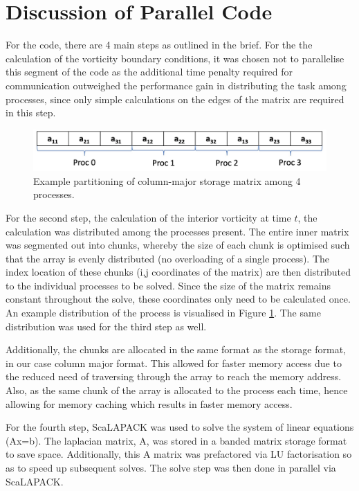 \documentclass[11pt]{article}
\begin{document}
	\section{Discussion of Parallel Code}
	For the code, there are 4 main steps as outlined in the brief. For the the calculation of the vorticity boundary conditions, it was chosen not to parallelise this segment of the code as the additional time penalty required for communication outweighed the performance gain in distributing the task among processes, since only simple calculations on the edges of the matrix are required in this step.
	\vspace{0.3cm}
	\begin{figure}
		\centering
		\includegraphics[width=\linewidth]{partition.jpg} 
	   	\caption{Example partitioning of column-major storage matrix among 4 processes.}
	   	\label{fig:partitioning_example}
	\end{figure}
	For the second step, the calculation of the interior vorticity at time $t$, the calculation was distributed among the processes present. The entire inner matrix was segmented out into chunks, whereby the size of each chunk is optimised such that the array is evenly distributed (no overloading of a single process). The index location of these chunks (i,j coordinates of the matrix) are then distributed to the individual processes to be solved. Since the size of the matrix remains constant throughout the solve, these coordinates only need to be calculated once. An example distribution of the process is visualised in Figure \ref{fig:partitioning_example}. The same distribution was used for the third step as well.
	
	\vspace{0.3cm}
	Additionally, the chunks are allocated in the same format as the storage format, in our case column major format. This allowed for faster memory access due to the reduced need of traversing through the array to reach the memory address. Also, as the same chunk of the array is allocated to the process each time, hence allowing for memory caching which results in faster memory access.
	
	\vspace{0.3cm}
	For the fourth step, ScaLAPACK was used to solve the system of linear equations (Ax=b). The laplacian matrix, A, was stored in a banded matrix storage format to save space. Additionally, this A matrix was prefactored via LU factorisation so as to speed up subsequent solves. The solve step was then done in parallel via ScaLAPACK.
	
\end{document}
